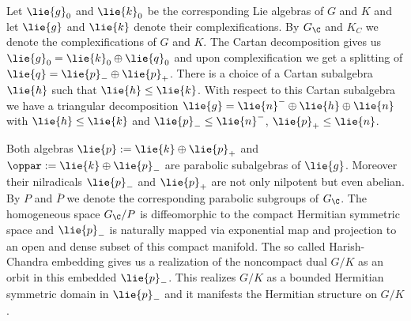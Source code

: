 Let $\lie{g}_0$ and $\lie{k}_0$ be the corresponding Lie algebras of $G$ and $K$ and let $\lie{g}$ and $\lie{k}$ denote their complexifications. By $G_\C$ and $K_C$ we denote the complexifications of $G$ and $K$. The Cartan decomposition gives us $\lie{g}_0 = \lie{k}_0 \oplus \lie{q}_0$ and upon complexification we get a splitting of  $\lie{q} = \lie{p}_-\oplus\lie{p}_+$. %
There is a choice of a Cartan subalgebra $\lie{h}$ such that $\lie{h} \leq \lie{k}$. With respect to this Cartan subalgebra we have a triangular decomposition $\lie{g}=\lie{n}^-\oplus\lie{h}\oplus\lie{n}$ with $\lie{h} \leq \lie{k}$ and $\lie{p}_-\leq \lie{n}^-$, $\lie{p}_+ \leq \lie{n}$.

Both algebras $\lie{p} := \lie{k}\oplus \lie{p}_+$ and $\oppar := \lie{k}\oplus\lie{p}_-$ are parabolic subalgebras of $\lie{g}$. Moreover their nilradicals $\lie{p}_-$ and $\lie{p}_+$ are not only nilpotent but even abelian. By $P$ and $\overline{P}$ we denote the corresponding parabolic subgroups of $G_\C$. The homogeneous space $G_\C/P$ is diffeomorphic to the compact Hermitian symmetric space and $\lie{p}_-$ is naturally mapped via exponential map and projection to an open and dense subset of this compact manifold. The so called Harish-Chandra embedding gives us a realization of the noncompact dual $G/K$ as an orbit in this embedded $\lie{p}_-$. This realizes $G/K$ as a bounded Hermitian symmetric domain in $\lie{p}_-$ and it manifests the Hermitian structure on $G/K$.

